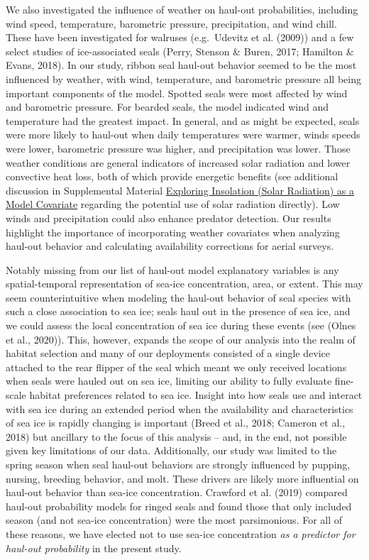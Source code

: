 \documentclass[fleqn,10pt,lineno]{wlpeerj} %
\begin{document}
We also investigated the influence of weather on haul-out probabilities,
including wind speed, temperature, barometric pressure, precipitation, and wind
chill. These have been investigated for walruses (e.g.~Udevitz et al.
(2009)) and a few select studies of ice-associated seals
(Perry, Stenson \& Buren, 2017; Hamilton \& Evans, 2018). In our study, ribbon seal haul-out behavior seemed to be the most
influenced by weather, with wind, temperature, and barometric pressure all being
important components of the model. Spotted seals were most affected by wind and
barometric pressure. For bearded seals, the model indicated wind and temperature
had the greatest impact. In general, and as might be expected, seals were more
likely to haul-out when daily temperatures were warmer, winds speeds were lower,
barometric pressure was higher, and precipitation was lower. Those weather
conditions are general indicators of increased solar radiation and lower
convective heat loss, both of which provide energetic benefits (see additional
discussion in Supplemental Material \hyperref[exploring-insolation-solar-radiation-as-a-model-covariate]{Exploring Insolation (Solar Radiation) as a
Model Covariate} regarding the potential use of solar radiation directly). Low
winds and precipitation could also enhance predator detection. Our results
highlight the importance of incorporating weather covariates when analyzing
haul-out behavior and calculating availability corrections for aerial surveys.

Notably missing from our list of haul-out model explanatory variables is any
spatial-temporal representation of sea-ice concentration, area, or extent. This
may seem counterintuitive when modeling the haul-out behavior of seal species
with such a close association to sea ice; seals haul out in the presence of sea
ice, and we could assess the local concentration of sea ice during these events
(see (Olnes et al., 2020)). This, however, expands the scope of our analysis into the
realm of habitat selection and many of our deployments consisted of a single
device attached to the rear flipper of the seal which meant we only received
locations when seals were hauled out on sea ice, limiting our ability to fully
evaluate fine-scale habitat preferences related to sea ice. Insight into how
seals use and interact with sea ice during an extended period when the
availability and characteristics of sea ice is rapidly changing is important
(Breed et al., 2018; Cameron et al., 2018) but ancillary to the focus of this analysis -- and,
in the end, not possible given key limitations of our data. Additionally, our
study was limited to the spring season when seal haul-out behaviors are strongly
influenced by pupping, nursing, breeding behavior, and molt. These drivers are
likely more influential on haul-out behavior than sea-ice concentration.
Crawford et al. (2019) compared haul-out probability models for ringed
seals and found those that only included season (and not sea-ice concentration)
were the most parsimonious. For all of these reasons, we have elected not to use
sea-ice concentration \emph{as a predictor for haul-out probability} in the present
study.
\end{document}
